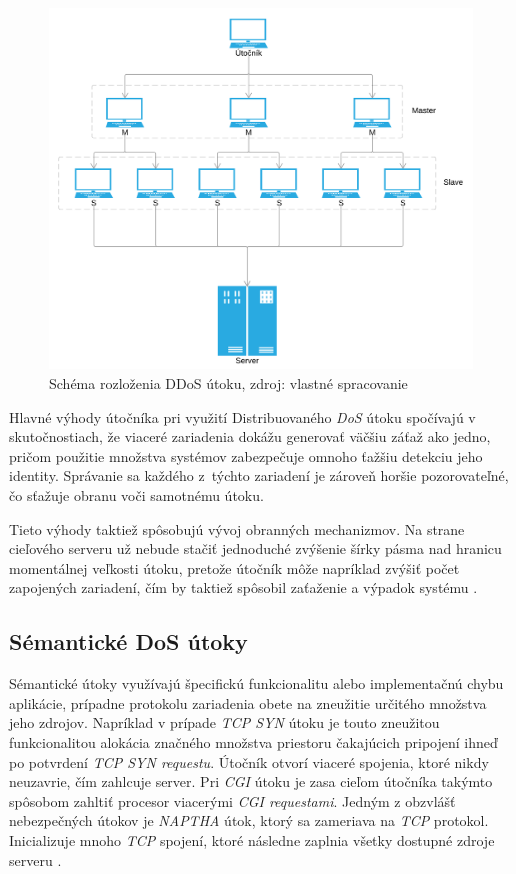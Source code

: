 \documentclass[
  digital, %
  oneside, %
  table,   %
  lof,     %
  nolot,   %
  nocover
]{fithesis3}
\begin{document}
\begin{figure}[h]
  \centering
    \includegraphics[width=.98\textwidth]{images/ddos.png}
  \caption{Schéma rozloženia DDoS útoku, zdroj: vlastné spracovanie}
  \label{fig:ddos}
\end{figure}

Hlavné výhody útočníka pri využití Distribuovaného \textit{DoS} útoku
spočívajú v skutočnostiach, že viaceré zariadenia dokážu generovať väčšiu záťaž ako jedno,
pričom použitie množstva systémov zabezpečuje omnoho ťažšiu detekciu jeho identity. Správanie
sa každého z~týchto zariadení je zároveň horšie pozorovateľné, čo sťažuje obranu voči samotnému útoku.

Tieto výhody taktiež spôsobujú vývoj obranných mechanizmov. Na strane cieľového serveru už
nebude stačiť jednoduché zvýšenie šírky pásma nad hranicu momentálnej veľkosti útoku, pretože
útočník môže napríklad zvýšiť počet zapojených zariadení, čím by taktiež spôsobil zaťaženie a
výpadok systému \cite{Zargar:2013:DDoS}.

\subsection{Sémantické DoS útoky}
Sémantické útoky využívajú špecifickú funkcionalitu alebo implementačnú chybu aplikácie,
prípadne protokolu zariadenia obete na zneužitie určitého množstva jeho zdrojov. Napríklad
v prípade \textit{TCP SYN} útoku je touto zneužitou funkcionalitou alokácia značného množstva
priestoru čakajúcich pripojení ihneď po potvrdení \textit{ TCP SYN requestu}. Útočník otvorí
viaceré spojenia, ktoré nikdy neuzavrie, čím zahlcuje server. 
Pri \textit{CGI} útoku je zasa cieľom útočníka takýmto spôsobom zahltiť procesor viacerými
\textit{CGI requestami}.
Jedným z obzvlášť nebezpečných útokov je \textit{NAPTHA} útok, ktorý sa zameriava na
\textit{TCP} protokol. Inicializuje mnoho \textit{TCP} spojení, ktoré následne zaplnia všetky dostupné zdroje serveru \cite{Mirkovic:2004:DoS}.
\end{document}
